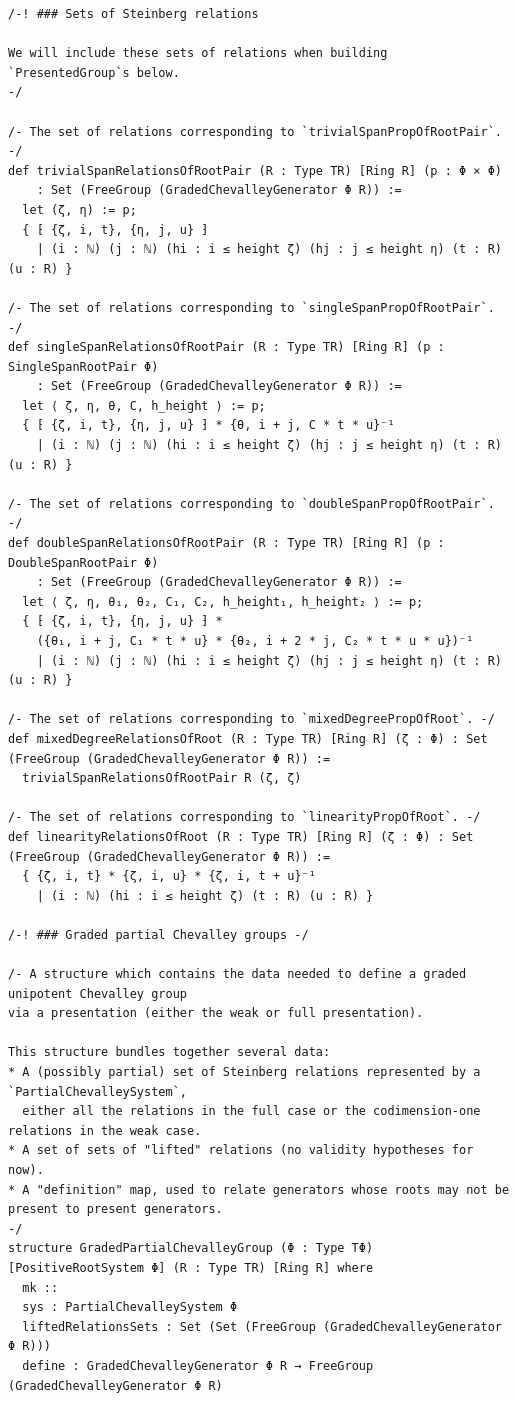 \begin{Verbatim}
/-! ### Sets of Steinberg relations

We will include these sets of relations when building `PresentedGroup`s below.
-/

/- The set of relations corresponding to `trivialSpanPropOfRootPair`. -/
def trivialSpanRelationsOfRootPair (R : Type TR) [Ring R] (p : Φ × Φ)
    : Set (FreeGroup (GradedChevalleyGenerator Φ R)) :=
  let (ζ, η) := p;
  { ⁅ {ζ, i, t}, {η, j, u} ⁆
    | (i : ℕ) (j : ℕ) (hi : i ≤ height ζ) (hj : j ≤ height η) (t : R) (u : R) }

/- The set of relations corresponding to `singleSpanPropOfRootPair`. -/
def singleSpanRelationsOfRootPair (R : Type TR) [Ring R] (p : SingleSpanRootPair Φ)
    : Set (FreeGroup (GradedChevalleyGenerator Φ R)) :=
  let ⟨ ζ, η, θ, C, h_height ⟩ := p;
  { ⁅ {ζ, i, t}, {η, j, u} ⁆ * {θ, i + j, C * t * u}⁻¹
    | (i : ℕ) (j : ℕ) (hi : i ≤ height ζ) (hj : j ≤ height η) (t : R) (u : R) }

/- The set of relations corresponding to `doubleSpanPropOfRootPair`. -/
def doubleSpanRelationsOfRootPair (R : Type TR) [Ring R] (p : DoubleSpanRootPair Φ)
    : Set (FreeGroup (GradedChevalleyGenerator Φ R)) :=
  let ⟨ ζ, η, θ₁, θ₂, C₁, C₂, h_height₁, h_height₂ ⟩ := p;
  { ⁅ {ζ, i, t}, {η, j, u} ⁆ *
    ({θ₁, i + j, C₁ * t * u} * {θ₂, i + 2 * j, C₂ * t * u * u})⁻¹
    | (i : ℕ) (j : ℕ) (hi : i ≤ height ζ) (hj : j ≤ height η) (t : R) (u : R) }

/- The set of relations corresponding to `mixedDegreePropOfRoot`. -/
def mixedDegreeRelationsOfRoot (R : Type TR) [Ring R] (ζ : Φ) : Set (FreeGroup (GradedChevalleyGenerator Φ R)) :=
  trivialSpanRelationsOfRootPair R (ζ, ζ)

/- The set of relations corresponding to `linearityPropOfRoot`. -/
def linearityRelationsOfRoot (R : Type TR) [Ring R] (ζ : Φ) : Set (FreeGroup (GradedChevalleyGenerator Φ R)) :=
  { {ζ, i, t} * {ζ, i, u} * {ζ, i, t + u}⁻¹
    | (i : ℕ) (hi : i ≤ height ζ) (t : R) (u : R) }

/-! ### Graded partial Chevalley groups -/

/- A structure which contains the data needed to define a graded unipotent Chevalley group
via a presentation (either the weak or full presentation).

This structure bundles together several data:
* A (possibly partial) set of Steinberg relations represented by a `PartialChevalleySystem`,
  either all the relations in the full case or the codimension-one relations in the weak case.
* A set of sets of "lifted" relations (no validity hypotheses for now).
* A "definition" map, used to relate generators whose roots may not be present to present generators.
-/
structure GradedPartialChevalleyGroup (Φ : Type TΦ) [PositiveRootSystem Φ] (R : Type TR) [Ring R] where
  mk ::
  sys : PartialChevalleySystem Φ
  liftedRelationsSets : Set (Set (FreeGroup (GradedChevalleyGenerator Φ R)))
  define : GradedChevalleyGenerator Φ R → FreeGroup (GradedChevalleyGenerator Φ R)


\end{Verbatim}

